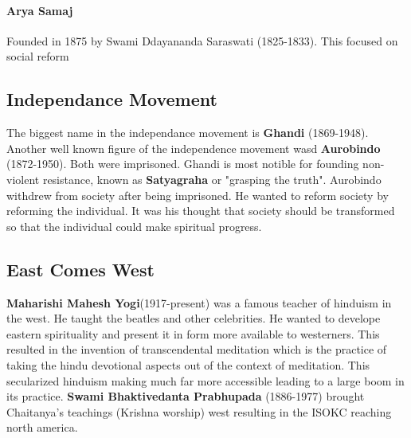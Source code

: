 \documentclass{article}
\begin{document}
\paragraph{Arya Samaj}
\label{par:arya_samaj}
Founded in 1875 by Swami Ddayananda Saraswati (1825-1833). This focused on social reform

\subsection*{Independance Movement}
\label{sub:independance_movement}
The biggest name in the independance movement is \textbf{Ghandi} (1869-1948). Another well known figure of the independence movement wasd \textbf{Aurobindo} (1872-1950). Both were imprisoned. Ghandi is most notible for founding non-violent resistance, known as \textbf{Satyagraha} or "grasping the truth". Aurobindo withdrew from society after being imprisoned. He wanted to reform society by reforming the individual. It was his thought that society should be transformed so that the individual could make spiritual progress.

\subsection*{East Comes West}
\label{sub:east_comes_west}
\textbf{Maharishi Mahesh Yogi}(1917-present) was a famous teacher of hinduism in the west. He taught the beatles and other celebrities. He wanted to develope eastern spirituality and present it in form more available to westerners. This resulted in the invention of transcendental meditation which is the practice of taking the hindu devotional aspects out of the context of meditation. This secularized hinduism making much far more accessible leading to a large boom in its practice. \textbf{Swami Bhaktivedanta Prabhupada} (1886-1977) brought Chaitanya's teachings (Krishna worship) west resulting in the ISOKC reaching north america.
\end{document}
